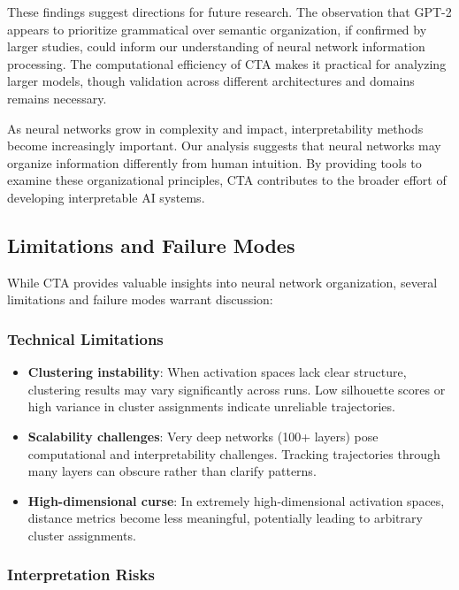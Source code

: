 These findings suggest directions for future research. The observation that GPT-2 appears to prioritize grammatical over semantic organization, if confirmed by larger studies, could inform our understanding of neural network information processing. The computational efficiency of CTA makes it practical for analyzing larger models, though validation across different architectures and domains remains necessary.

As neural networks grow in complexity and impact, interpretability methods become increasingly important. Our analysis suggests that neural networks may organize information differently from human intuition. By providing tools to examine these organizational principles, CTA contributes to the broader effort of developing interpretable AI systems.

\subsection{Limitations and Failure Modes}

While CTA provides valuable insights into neural network organization, several limitations and failure modes warrant discussion:

\subsubsection{Technical Limitations}

\begin{itemize}
    \item \textbf{Clustering instability}: When activation spaces lack clear structure, clustering results may vary significantly across runs. Low silhouette scores or high variance in cluster assignments indicate unreliable trajectories.
    \item \textbf{Scalability challenges}: Very deep networks (100+ layers) pose computational and interpretability challenges. Tracking trajectories through many layers can obscure rather than clarify patterns.
    \item \textbf{High-dimensional curse}: In extremely high-dimensional activation spaces, distance metrics become less meaningful, potentially leading to arbitrary cluster assignments.
\end{itemize}

\subsubsection{Interpretation Risks}

